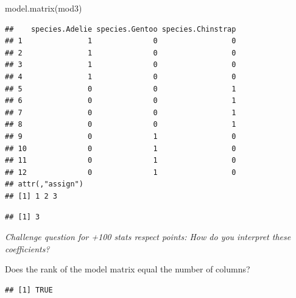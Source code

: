 \documentclass[
  openany]{book}
\newenvironment{Shaded}{\begin{snugshade}}{\end{snugshade}}
\newcommand{\FunctionTok}[1]{\textcolor[rgb]{0.00,0.00,0.00}{#1}}
\newcommand{\NormalTok}[1]{#1}
\newcommand{\SpecialCharTok}[1]{\textcolor[rgb]{0.00,0.00,0.00}{#1}}
\begin{document}
\begin{Shaded}
\begin{Highlighting}[]
\FunctionTok{model.matrix}\NormalTok{(mod3)}
\end{Highlighting}
\end{Shaded}

\begin{verbatim}
##    species.Adelie species.Gentoo species.Chinstrap
## 1               1              0                 0
## 2               1              0                 0
## 3               1              0                 0
## 4               1              0                 0
## 5               0              0                 1
## 6               0              0                 1
## 7               0              0                 1
## 8               0              0                 1
## 9               0              1                 0
## 10              0              1                 0
## 11              0              1                 0
## 12              0              1                 0
## attr(,"assign")
## [1] 1 2 3
\end{verbatim}

\begin{Shaded}
\end{Shaded}

\begin{verbatim}
## [1] 3
\end{verbatim}

\emph{Challenge question for +100 stats respect points: How do you interpret these coefficients?}

Does the rank of the model matrix equal the number of columns?

\begin{Shaded}
\end{Shaded}

\begin{verbatim}
## [1] TRUE
\end{verbatim}
\end{document}
